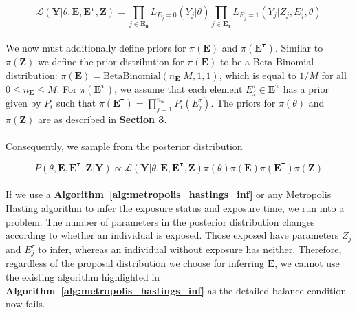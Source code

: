 \begin{equation}
\mathcal{L}(\mathbf{Y} | \theta, \mathbf{E}, \mathbf{E^\tau}, \mathbf{Z}) = \prod_{j \in \mathbf{E_0}}L_{E_j = 0}(Y_{j}| \theta) \prod_{j \in \mathbf{E_1}}L_{E_j = 1}(Y_{j}| Z_j, E_j^\tau, \theta) 
\end{equation}

\paragraph{}We now must additionally define priors for $\pi(\mathbf{E})$ and $\pi(\mathbf{E^{\tau}})$. Similar to $\pi(\mathbf{Z})$ we define the prior distribution for  $\pi(\mathbf{E})$ to be a Beta Binomial distribution: $\pi(\mathbf{E}) = \text{BetaBinomial}(n_{\mathbf{E}}| M, 1, 1)$, which is equal to $1/M$ for all $0 \leq n_{\mathbf{E}} \leq M$. For $\pi(\mathbf{E^{\tau}})$, we assume that each element $E_j^\tau \in \mathbf{E^{\tau}}$ has a prior given by $P_t$ such that $\pi(\mathbf{E^{\tau}}) = \prod_{j = 1}^{n_\mathbf{E}} P_t(E_j^\tau)$. The priors for $\pi(\theta)$ and $\pi(\mathbf{Z})$ are as described in \textbf{Section 3}. 

\paragraph{}Consequently, we sample from the posterior distribution

\begin{equation}
P(\theta, \mathbf{E}, \mathbf{E^\tau}, \mathbf{Z} | \mathbf{Y}) \propto \mathcal{L}(\mathbf{Y} | \theta, \mathbf{E}, \mathbf{E^\tau}, \mathbf{Z})\pi(\theta)\pi(\mathbf{E})\pi( \mathbf{E^\tau})\pi(\mathbf{Z})
\end{equation}


\paragraph{}If we use a \textbf{Algorithm~\ref{alg:metropolis_hastings_inf}} or any Metropolis Hasting algorithm to infer the exposure status and exposure time, we run into a problem. The number of parameters in the posterior distribution changes according to whether an individual is exposed. Those exposed have parameters $Z_j$ and $E^\tau_j$ to infer, whereas an individual without exposure has neither. Therefore, regardless of the proposal distribution we choose for inferring $\mathbf{E}$, we cannot use the existing algorithm highlighted in \textbf{Algorithm~\ref{alg:metropolis_hastings_inf}} as the detailed balance condition now fails. 


